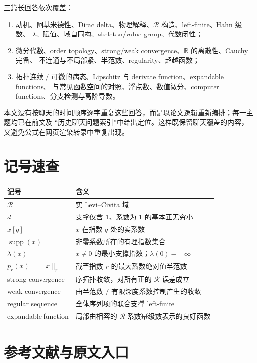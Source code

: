 \documentclass[11pt,a4paper]{article}
\theoremstyle{remark}
\newcommand{\LC}{\mathcal R}
\newcommand{\supp}{\operatorname{supp}}
\newcommand{\R}{\mathbb R}
\begin{document}
三篇长回答依次覆盖：

\begin{enumerate}
\item 动机、阿基米德性、Dirac delta、物理解释、$\LC$ 构造、left-finite、Hahn 级数、
$\lambda$、赋值、域自同构、skeleton/value group、代数闭性；
\item 微分代数、order topology、strong/weak convergence、$\R$ 的离散性、Cauchy 完备、
不连通与不局部紧、半范数、regularity、超越函数；
\item 拓扑连续 / 可微的病态、Lipschitz 与 derivate function、expandable functions、
与常见函数空间的对照、浮点数、数值微分、computer functions、分支检测与高阶导数。
\end{enumerate}

本文没有按聊天的时间顺序逐字重复这些回答，而是以论文逻辑重新编排；每一主题均已在前文及
“历史聊天问题索引”中给出定位。这样既保留聊天覆盖的内容，又避免公式在网页渲染转录中重复出现。

\section{记号速查}

\begin{tabularx}{\textwidth}{p{}X}
\toprule
记号 & 含义\\
\midrule
$\LC$ & 实 Levi--Civita 域\\
$d$ & 支撑仅含 $1$、系数为 $1$ 的基本正无穷小\\
$x[q]$ & $x$ 在指数 $q$ 处的实系数\\
$\supp(x)$ & 非零系数所在的有理指数集合\\
$\lambda(x)$ & $x\ne0$ 的最小支撑指数；$\lambda(0)=+\infty$\\
$p_r(x)=\|x\|_r$ & 截至指数 $r$ 的最大系数绝对值半范数\\
strong convergence & 序拓扑收敛，对所有正的 $\LC$-误差成立\\
weak convergence & 由半范数 / 有限深度系数控制产生的收敛\\
regular sequence & 全体序列项的联合支撑 left-finite\\
expandable function & 局部由相容的 $\LC$ 系数幂级数表示的良好函数\\
\bottomrule
\end{tabularx}

\section{参考文献与原文入口}
\end{document}
